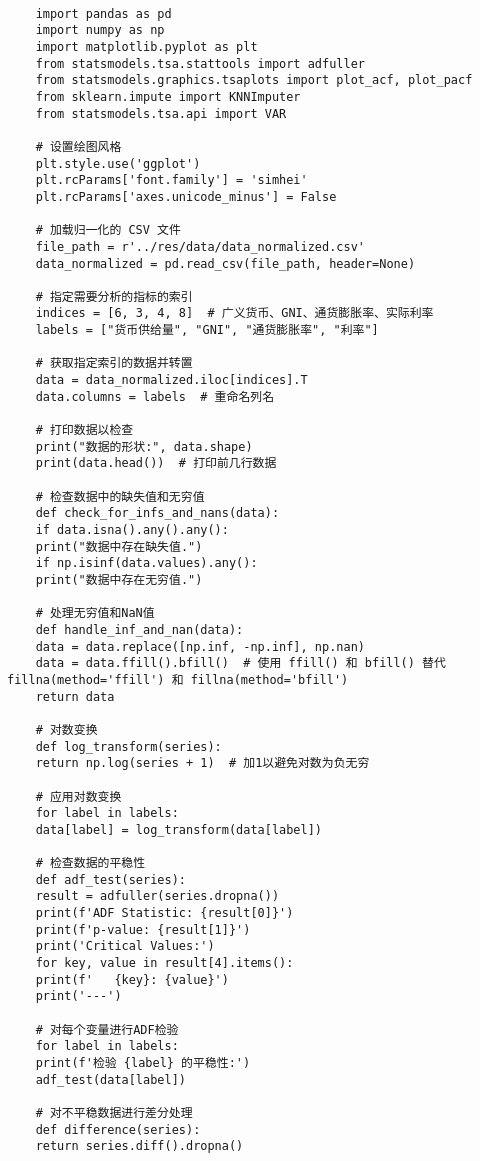 
\begin{lstlisting}[caption={问题四处理代码}]
	
	import pandas as pd
	import numpy as np
	import matplotlib.pyplot as plt
	from statsmodels.tsa.stattools import adfuller
	from statsmodels.graphics.tsaplots import plot_acf, plot_pacf
	from sklearn.impute import KNNImputer
	from statsmodels.tsa.api import VAR
	
	# 设置绘图风格
	plt.style.use('ggplot')
	plt.rcParams['font.family'] = 'simhei'
	plt.rcParams['axes.unicode_minus'] = False
	
	# 加载归一化的 CSV 文件
	file_path = r'../res/data/data_normalized.csv'
	data_normalized = pd.read_csv(file_path, header=None)
	
	# 指定需要分析的指标的索引
	indices = [6, 3, 4, 8]  # 广义货币、GNI、通货膨胀率、实际利率
	labels = ["货币供给量", "GNI", "通货膨胀率", "利率"]
	
	# 获取指定索引的数据并转置
	data = data_normalized.iloc[indices].T  
	data.columns = labels  # 重命名列名
	
	# 打印数据以检查
	print("数据的形状:", data.shape)
	print(data.head())  # 打印前几行数据
	
	# 检查数据中的缺失值和无穷值
	def check_for_infs_and_nans(data):
	if data.isna().any().any():
	print("数据中存在缺失值.")
	if np.isinf(data.values).any():
	print("数据中存在无穷值.")
	
	# 处理无穷值和NaN值
	def handle_inf_and_nan(data):
	data = data.replace([np.inf, -np.inf], np.nan)
	data = data.ffill().bfill()  # 使用 ffill() 和 bfill() 替代 fillna(method='ffill') 和 fillna(method='bfill')
	return data
	
	# 对数变换
	def log_transform(series):
	return np.log(series + 1)  # 加1以避免对数为负无穷
	
	# 应用对数变换
	for label in labels:
	data[label] = log_transform(data[label])
	
	# 检查数据的平稳性
	def adf_test(series):
	result = adfuller(series.dropna())
	print(f'ADF Statistic: {result[0]}')
	print(f'p-value: {result[1]}')
	print('Critical Values:')
	for key, value in result[4].items():
	print(f'   {key}: {value}')
	print('---')
	
	# 对每个变量进行ADF检验
	for label in labels:
	print(f'检验 {label} 的平稳性:')
	adf_test(data[label])
	
	# 对不平稳数据进行差分处理
	def difference(series):
	return series.diff().dropna()
	

\end{lstlisting}
